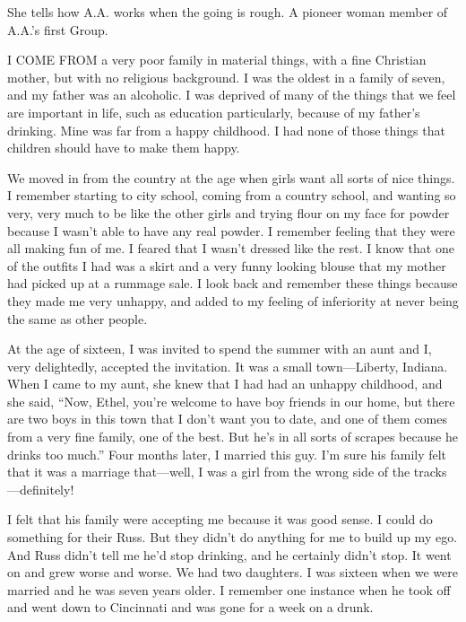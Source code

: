 
\bbChapterPreamble


\begin{biblechapter}
    She tells how A.A. works when the going is rough.
\verse A pioneer woman member of A.A.’s first Group.
\end{biblechapter}


\begin{biblechapter}
    I COME FROM a very poor family in material things, 
    with a fine Christian mother, 
    but with no religious background.
\verse I was the oldest in a family of seven, 
    and my father was an alcoholic.
\verse I was deprived of many of the things that we feel 
    are important in life, 
    such as education particularly, 
    because of my father’s drinking.
\verse Mine was far from a happy childhood.
\verse I had none of those things that children should have to make them happy.

\verse We moved in from the country at the age when girls want all sorts of nice things. I remember starting to city school, coming from a country school, and wanting so very, very much to be like the other girls and trying flour on my face for powder because I wasn’t able to have any real powder. I remember feeling that they were all making fun of me. I feared that I wasn’t dressed like the rest. I know that one of the outfits I had was a skirt and a very funny looking blouse that my mother had picked up at a rummage sale. I look back and remember these things because they made me very unhappy, and added to my feeling of inferiority at never being the same as other people.

At the age of sixteen, I was invited to spend the summer with an aunt and I, very delightedly, accepted the invitation. It was a small town—Liberty, Indiana. When I came to my aunt, she knew that I had had an unhappy childhood, and she said, “Now, Ethel, you’re welcome to have boy friends in our home, but there are two boys in this town that I don’t want you to date, and one of them comes from a very fine family, one of the best. But he’s in all sorts of scrapes because he drinks too much.” Four months later, I married this guy. I’m sure his family felt that it was a marriage that—well, I was a girl from the wrong side of the tracks—definitely!

I felt that his family were accepting me because it was good sense. I could do something for their Russ. But they didn’t do anything for me to build up my ego. And Russ didn’t tell me he’d stop drinking, and he certainly didn’t stop. It went on and grew worse and worse. We had two daughters. I was sixteen when we were married and he was seven years older. I remember one instance when he took off and went down to Cincinnati and was gone for a week on a drunk.


\end{biblechapter}

